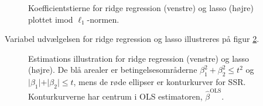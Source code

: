 \begin{figure}[H]
\centering
\begin{minipage}{0.4\linewidth}
\end{minipage}
\hspace{0.2cm}
\begin{minipage}{0.4\linewidth}
\end{minipage}
\caption{Koefficientstierne for ridge regression (venstre) og lasso (højre) plottet imod \(\ell_1\)-normen.} \label{fig:crime_koef}
\end{figure}
%
Variabel udvælgelsen for ridge regression og lasso illustreres på figur \ref{fig:LassoRig}.
%
\begin{figure}[H]
\centering
\begin{minipage}{0.4\linewidth}
\scalebox{0.7}{}
\end{minipage}
\hspace{0.2cm}
\begin{minipage}{0.4\linewidth}
\scalebox{0.7}{}
\end{minipage}
\caption{Estimations illustration for ridge regression (venstre) og lasso (højre). 
De blå arealer er betingelsesområderne $\beta_1^2+\beta_2^2 \leq t^2$ og $\vert \beta_1 \vert+\vert \beta_2 \vert \leq t$, mens de røde ellipser er konturkurver for SSR. Konturkurverne har centrum i OLS estimatoren, $\hat{\beta}^\text{OLS}$.} \label{fig:LassoRig}
\end{figure}
